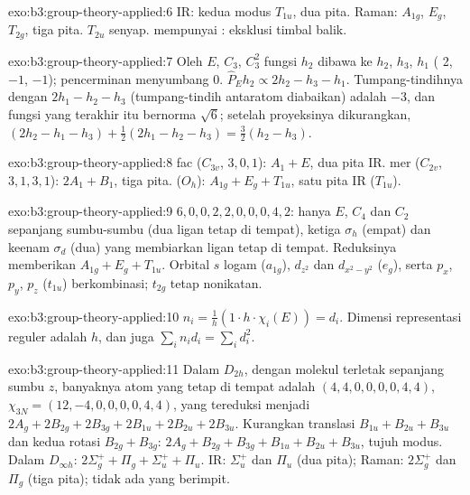 \begin{solution}{exo:b3:group-theory-applied:6}
IR: kedua modus $T_{1u}$, dua pita. Raman: $A_{1g}$, $E_g$, $T_{2g}$, tiga pita.
$T_{2u}$ senyap.  mempunyai : eksklusi timbal balik.
\end{solution}

\begin{solution}{exo:b3:group-theory-applied:7}
Oleh $E$, $C_3$, $C_3^2$ fungsi $h_2$ dibawa ke $h_2$, $h_3$, $h_1$ (
2, $-1$, $-1$); pencerminan menyumbang 0. $\hat P_Eh_2 \propto 2h_2 - h_3 - h_1$.
Tumpang-tindihnya dengan $2h_1 - h_2 - h_3$ (tumpang-tindih antaratom
diabaikan) adalah $-3$, dan fungsi yang terakhir itu bernorma $\sqrt6$;
setelah proyeksinya dikurangkan, $(2h_2 - h_1 - h_3) +
\frac12(2h_1 - h_2 - h_3) = \frac32(h_2 - h_3)$.
\end{solution}

\begin{solution}{exo:b3:group-theory-applied:8}
fac ($C_{3v}$,  $3, 0, 1$): $A_1 + E$, dua pita IR. mer ($C_{2v}$,
 $3, 1, 3, 1$): $2A_1 + B_1$, tiga pita.  ($O_h$): $A_{1g} + E_g
+ T_{1u}$, satu pita IR ($T_{1u}$).
\end{solution}

\begin{solution}{exo:b3:group-theory-applied:9}
 $6, 0, 0, 2, 2, 0, 0, 0, 4, 2$: hanya $E$, $C_4$ dan $C_2$ sepanjang
sumbu-sumbu (dua ligan tetap di tempat), ketiga $\sigma_h$ (empat) dan keenam
$\sigma_d$ (dua) yang membiarkan ligan tetap di tempat. Reduksinya memberikan
$A_{1g} + E_g + T_{1u}$. Orbital $s$ logam ($a_{1g}$), $d_{z^2}$ dan $d_{x^2-y^2}$
($e_g$), serta $p_x$, $p_y$, $p_z$ ($t_{1u}$) berkombinasi; $t_{2g}$ tetap
nonikatan.
\end{solution}

\begin{solution}{exo:b3:group-theory-applied:10}
$n_i = \frac1h(1\cdot h\cdot\chi_i(E)) = d_i$. Dimensi representasi reguler
adalah $h$, dan juga $\sum_in_id_i = \sum_id_i^2$.
\end{solution}

\begin{solution}{exo:b3:group-theory-applied:11}
Dalam $D_{2h}$, dengan molekul terletak sepanjang sumbu $z$, banyaknya atom
yang tetap di tempat adalah $(4, 4, 0, 0, 0, 0, 4, 4)$, $\chi_{3N}
= (12, -4, 0, 0, 0, 0, 4, 4)$, yang tereduksi menjadi $2A_g + 2B_{2g} + 2B_{3g} + 2B_{1u} + 2B_{2u}
+ 2B_{3u}$. Kurangkan translasi $B_{1u} + B_{2u} + B_{3u}$ dan kedua rotasi
$B_{2g} + B_{3g}$: $2A_g + B_{2g} + B_{3g} + B_{1u} + B_{2u} + B_{3u}$, tujuh modus.
Dalam $D_{\infty h}$: $2\Sigma_g^+ + \Pi_g + \Sigma_u^+ + \Pi_u$. IR: $\Sigma_u^+$ dan
$\Pi_u$ (dua pita); Raman: $2\Sigma_g^+$ dan $\Pi_g$ (tiga pita); tidak ada
yang berimpit.
\end{solution}

